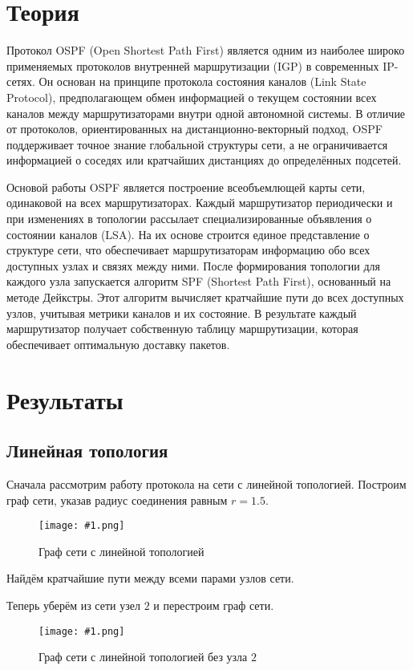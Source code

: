 \documentclass[a4paper,12pt]{article}
\newcommand{\plot}[3]{
    \begin{figure}[H]
        \centering
        \texttt{[image: \#1.png]}
        \caption{#2}
        \label{#3}
    \end{figure}
}
\begin{document}
\section{Теория}
Протокол OSPF (Open Shortest Path First) является одним из наиболее широко применяемых протоколов внутренней маршрутизации (IGP) в современных IP-сетях. Он основан на принципе протокола состояния каналов (Link State Protocol), предполагающем обмен информацией о текущем состоянии всех каналов между маршрутизаторами внутри одной автономной системы. В отличие от протоколов, ориентированных на дистанционно-векторный подход, OSPF поддерживает точное знание глобальной структуры сети, а не ограничивается информацией о соседях или кратчайших дистанциях до определённых подсетей.

Основой работы OSPF является построение всеобъемлющей карты сети, одинаковой на всех маршрутизаторах. Каждый маршрутизатор периодически и при изменениях в топологии рассылает специализированные объявления о состоянии каналов (LSA). На их основе строится единое представление о структуре сети, что обеспечивает маршрутизаторам информацию обо всех доступных узлах и связях между ними. После формирования топологии для каждого узла запускается алгоритм SPF (Shortest Path First), основанный на методе Дейкстры. Этот алгоритм вычисляет кратчайшие пути до всех доступных узлов, учитывая метрики каналов и их состояние. В результате каждый маршрутизатор получает собственную таблицу маршрутизации, которая обеспечивает оптимальную доставку пакетов.

\section{Результаты}
\subsection{Линейная топология}
Сначала рассмотрим работу протокола на сети с линейной топологией. Построим граф сети, указав радиус соединения равным $r = 1.5$. 

\plot{l_f}{Граф сети с линейной топологией}{p:fullLine}

Найдём кратчайшие пути между всеми парами узлов сети.



Теперь уберём из сети узел $2$ и перестроим граф сети.

\plot{l_r}{Граф сети с линейной топологией без узла $2$}{p:rmLine}
\end{document}
